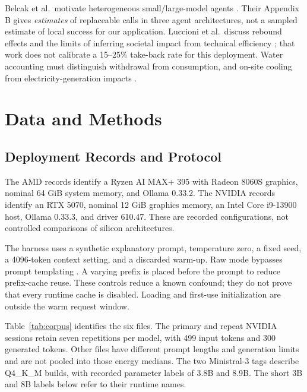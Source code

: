 \documentclass[conference]{IEEEtran}
\begin{document}
Belcak et al.\ motivate heterogeneous small/large-model agents
\cite{belcak2025}. Their Appendix B gives \emph{estimates} of replaceable
calls in three agent architectures, not a sampled estimate of local success
for our application. Luccioni et al.\ discuss rebound effects and the
limits of inferring societal impact from technical efficiency
\cite{luccioni2025}; that work does not calibrate a 15--25\% take-back rate
for this deployment. Water accounting must distinguish withdrawal from
consumption, and on-site cooling from electricity-generation impacts
\cite{li2025water}.

\section{Data and Methods}
\subsection{Deployment Records and Protocol}
The AMD records identify a Ryzen AI MAX+ 395 with Radeon 8060S graphics,
nominal 64 GiB system memory, and Ollama 0.33.2. The NVIDIA records identify
an RTX 5070, nominal 12 GiB graphics memory, an Intel Core i9-13900 host,
Ollama 0.33.3, and driver 610.47. These are recorded configurations, not
controlled comparisons of silicon architectures.

The harness uses a synthetic explanatory prompt, temperature zero, a fixed
seed, a 4096-token context setting, and a discarded warm-up.
Raw mode bypasses prompt templating \cite{ollamaapi2026}.
A varying prefix is placed before the prompt to reduce prefix-cache reuse.
These controls reduce a known confound; they do not prove that every
runtime cache is disabled. Loading and first-use initialization are
outside the warm request window.

Table~\ref{tab:corpus} identifies the six files. The primary and repeat
NVIDIA sessions retain seven repetitions per model, with 499 input tokens
and 300 generated tokens. Other files have different prompt lengths and
generation limits and are not pooled into those energy medians.
The two Ministral-3 tags describe Q4\_K\_M builds, with recorded parameter
labels of 3.8B and 8.9B. The short 3B and 8B labels below refer to their
runtime names.
\end{document}
